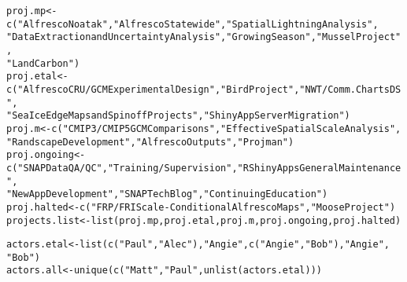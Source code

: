 \documentclass{article}\usepackage[]{graphicx}\usepackage[]{color}
\makeatletter
\newcommand{\hlstr}[1]{\textcolor[rgb]{0.863,0.196,0.184}{#1}}%
\newcommand{\hlstd}[1]{\textcolor[rgb]{0.514,0.58,0.588}{#1}}%
\newcommand{\hlkwb}[1]{\textcolor[rgb]{0.522,0.6,0}{#1}}%
\newcommand{\hlkwd}[1]{\textcolor[rgb]{0.576,0.631,0.631}{#1}}%
\newenvironment{kframe}{%
 \def\at@end@of@kframe{}%
 \ifinner\ifhmode%
  \def\at@end@of@kframe{\end{minipage}}%
  \begin{minipage}{\columnwidth}%
 \fi\fi%
 \def\FrameCommand##1{\hskip\@totalleftmargin \hskip-\fboxsep
 \colorbox{shadecolor}{##1}\hskip-\fboxsep
     \hskip-\linewidth \hskip-\@totalleftmargin \hskip\columnwidth}%
 \MakeFramed {\advance\hsize-\width
   \@totalleftmargin\z@ \linewidth\hsize
   \@setminipage}}%
 {\par\unskip\endMakeFramed%
 \at@end@of@kframe}
\newenvironment{knitrout}{}{} %
\makeatother
\begin{document}
\begin{knitrout}
\color{fgcolor}\begin{kframe}
\begin{alltt}
\hlstd{proj.mp} \hlkwb{<-} \hlkwd{c}\hlstd{(}\hlstr{"Alfresco Noatak"}\hlstd{,} \hlstr{"Alfresco Statewide"}\hlstd{,} \hlstr{"Spatial Lightning Analysis"}\hlstd{,}
    \hlstr{"Data Extraction and Uncertainty Analysis"}\hlstd{,} \hlstr{"Growing Season"}\hlstd{,} \hlstr{"Mussel Project"}\hlstd{,}
    \hlstr{"Land Carbon"}\hlstd{)}
\hlstd{proj.etal} \hlkwb{<-} \hlkwd{c}\hlstd{(}\hlstr{"Alfresco CRU/GCM Experimental Design"}\hlstd{,} \hlstr{"Bird Project"}\hlstd{,} \hlstr{"NWT/Comm. Charts DS"}\hlstd{,}
    \hlstr{"Sea Ice Edge Maps and Spinoff Projects"}\hlstd{,} \hlstr{"Shiny App Server Migration"}\hlstd{)}
\hlstd{proj.m} \hlkwb{<-} \hlkwd{c}\hlstd{(}\hlstr{"CMIP3/CMIP5 GCM Comparisons"}\hlstd{,} \hlstr{"Effective Spatial Scale Analysis"}\hlstd{,}
    \hlstr{"Randscape Development"}\hlstd{,} \hlstr{"Alfresco Outputs"}\hlstd{,} \hlstr{"Projman"}\hlstd{)}
\hlstd{proj.ongoing} \hlkwb{<-} \hlkwd{c}\hlstd{(}\hlstr{"SNAP Data QA/QC"}\hlstd{,} \hlstr{"Training/Supervision"}\hlstd{,} \hlstr{"R Shiny Apps General Maintenance"}\hlstd{,}
    \hlstr{"New App Development"}\hlstd{,} \hlstr{"SNAP Tech Blog"}\hlstd{,} \hlstr{"Continuing Education"}\hlstd{)}
\hlstd{proj.halted} \hlkwb{<-} \hlkwd{c}\hlstd{(}\hlstr{"FRP/FRI Scale-Conditional Alfresco Maps"}\hlstd{,} \hlstr{"Moose Project"}\hlstd{)}
\hlstd{projects.list} \hlkwb{<-} \hlkwd{list}\hlstd{(proj.mp, proj.etal, proj.m, proj.ongoing, proj.halted)}
\end{alltt}
\end{kframe}
\end{knitrout}

\begin{knitrout}
\color{fgcolor}\begin{kframe}
\begin{alltt}
\hlstd{actors.etal} \hlkwb{<-} \hlkwd{list}\hlstd{(}\hlkwd{c}\hlstd{(}\hlstr{"Paul"}\hlstd{,} \hlstr{"Alec"}\hlstd{),} \hlstr{"Angie"}\hlstd{,} \hlkwd{c}\hlstd{(}\hlstr{"Angie"}\hlstd{,} \hlstr{"Bob"}\hlstd{),} \hlstr{"Angie"}\hlstd{,}
    \hlstr{"Bob"}\hlstd{)}
\hlstd{actors.all} \hlkwb{<-} \hlkwd{unique}\hlstd{(}\hlkwd{c}\hlstd{(}\hlstr{"Matt"}\hlstd{,} \hlstr{"Paul"}\hlstd{,} \hlkwd{unlist}\hlstd{(actors.etal)))}
\end{alltt}
\end{kframe}
\end{knitrout}
\end{document}
